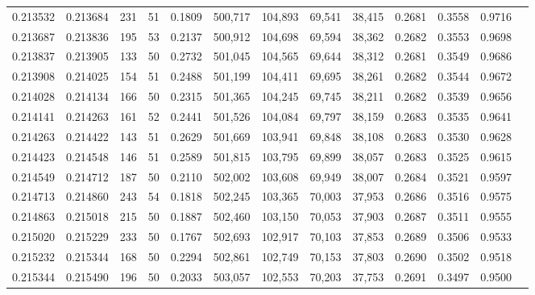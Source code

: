 \begin{tabular}{rrrrrrrrrrrrr}
0.213532 & 0.213684 &   231 &  51 &                                     0.1809 & 500,717 & 104,893 &  69,541 &  38,415 & 0.2681 & 0.3558 & 0.9716 \\
0.213687 & 0.213836 &   195 &  53 &                                     0.2137 & 500,912 & 104,698 &  69,594 &  38,362 & 0.2682 & 0.3553 & 0.9698 \\
0.213837 & 0.213905 &   133 &  50 &                                     0.2732 & 501,045 & 104,565 &  69,644 &  38,312 & 0.2681 & 0.3549 & 0.9686 \\
0.213908 & 0.214025 &   154 &  51 &                                     0.2488 & 501,199 & 104,411 &  69,695 &  38,261 & 0.2682 & 0.3544 & 0.9672 \\
0.214028 & 0.214134 &   166 &  50 &                                     0.2315 & 501,365 & 104,245 &  69,745 &  38,211 & 0.2682 & 0.3539 & 0.9656 \\
0.214141 & 0.214263 &   161 &  52 &                                     0.2441 & 501,526 & 104,084 &  69,797 &  38,159 & 0.2683 & 0.3535 & 0.9641 \\
0.214263 & 0.214422 &   143 &  51 &                                     0.2629 & 501,669 & 103,941 &  69,848 &  38,108 & 0.2683 & 0.3530 & 0.9628 \\
0.214423 & 0.214548 &   146 &  51 &                                     0.2589 & 501,815 & 103,795 &  69,899 &  38,057 & 0.2683 & 0.3525 & 0.9615 \\
0.214549 & 0.214712 &   187 &  50 &                                     0.2110 & 502,002 & 103,608 &  69,949 &  38,007 & 0.2684 & 0.3521 & 0.9597 \\
0.214713 & 0.214860 &   243 &  54 &                                     0.1818 & 502,245 & 103,365 &  70,003 &  37,953 & 0.2686 & 0.3516 & 0.9575 \\
0.214863 & 0.215018 &   215 &  50 &                                     0.1887 & 502,460 & 103,150 &  70,053 &  37,903 & 0.2687 & 0.3511 & 0.9555 \\
0.215020 & 0.215229 &   233 &  50 &                                     0.1767 & 502,693 & 102,917 &  70,103 &  37,853 & 0.2689 & 0.3506 & 0.9533 \\
0.215232 & 0.215344 &   168 &  50 &                                     0.2294 & 502,861 & 102,749 &  70,153 &  37,803 & 0.2690 & 0.3502 & 0.9518 \\
0.215344 & 0.215490 &   196 &  50 &                                     0.2033 & 503,057 & 102,553 &  70,203 &  37,753 & 0.2691 & 0.3497 & 0.9500 \\

\end{tabular}
